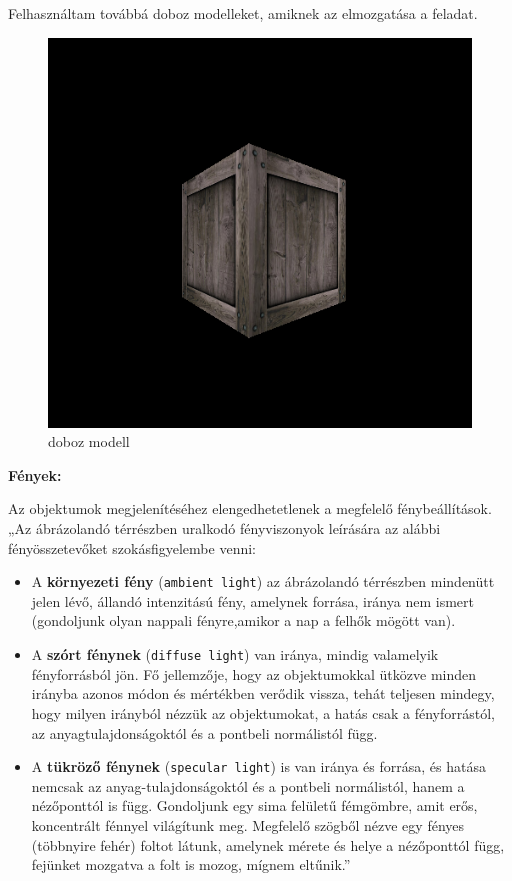 Felhasználtam továbbá doboz modelleket, amiknek az elmozgatása a feladat.
\begin{figure}[htp]
    \centering
   	\includegraphics[width=4truecm, height=3truecm]{images/box.png}
	\caption{doboz modell}
\end{figure}

{\bf Fények:}

Az objektumok megjelenítéséhez elengedhetetlenek a megfelelő fénybeállítások.\\

„Az ábrázolandó térrészben uralkodó fényviszonyok leírására az alábbi fényösszetevőket szokásfigyelembe venni:

\begin{itemize}
\item A {\bf környezeti fény} (\texttt{ambient light}) az ábrázolandó térrészben mindenütt jelen lévő, állandó intenzitású fény, amelynek forrása, iránya nem ismert (gondoljunk olyan nappali fényre,amikor a nap a felhők mögött van).
\item A {\bf szórt fénynek} (\texttt{diffuse light}) van iránya, mindig valamelyik fényforrásból jön. Fő jellemzője, hogy az objektumokkal ütközve minden irányba azonos módon és mértékben verődik vissza, tehát teljesen mindegy, hogy milyen irányból nézzük az objektumokat, a hatás csak a fényforrástól, az anyagtulajdonságoktól és a pontbeli normálistól függ.
\item A {\bf tükröző fénynek} (\texttt{specular light}) is van iránya és forrása, és hatása nemcsak az anyag-tulajdonságoktól és a pontbeli normálistól, hanem a nézőponttól is függ. Gondoljunk egy sima felületű fémgömbre, amit erős, koncentrált fénnyel világítunk meg. Megfelelő szögből nézve egy fényes (többnyire fehér) foltot látunk, amelynek mérete és helye a nézőponttól függ, fejünket mozgatva a folt is mozog, mígnem eltűnik.”
\end{itemize}

